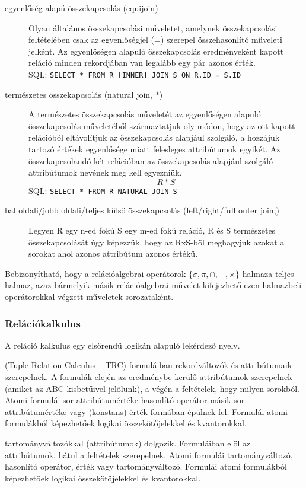 \begin{description}[nosep]
\begin{description}
		\item[egyenlőség alapú összekapcsolás (equijoin)] Olyan általános összekapcsolási műveletet, amelynek összekapcsolási feltételében csak az egyenlőségjel (=) szerepel összehasonlító műveleti jelként. Az egyenlőségen alapuló összekapcsolás eredményeként kapott reláció minden rekordjában van legalább egy pár azonos érték.\\
		SQL: \verb|SELECT * FROM R [INNER] JOIN S ON R.ID = S.ID|
		
		\item[természetes összekapcsolás (natural join, $*$)] A természetes összekapcsolás műveletét az egyenlőségen alapuló összekapcsolás műveletéből származtatjuk oly módon, hogy az ott kapott relációból eltávolítjuk az összekapcsolás alapjául szolgáló, a hozzájuk tartozó értékek egyenlősége miatt felesleges attribútumok egyikét. Az összekapcsolandó két relációban az összekapcsolás alapjául szolgáló attribútumok nevének meg kell egyezniük.
		$$R*S$$
		SQL: \verb|SELECT * FROM R NATURAL JOIN S|
		
		\item[bal oldali/jobb oldali/teljes külső összekapcsolás (left/right/full outer join,)] Legyen R egy n-ed fokú S egy m-ed fokú reláció, R és S természetes összekapcsolását úgy képezzük, hogy az RxS-ből meghagyjuk azokat a sorokat ahol azonos attribútum azonos értékű.
	\end{description}
\end{description}
\begin{theorem}
	Bebizonyítható, hogy a relációalgebrai operátorok $\{ \sigma, \pi, \cap, -, \times \}$ halmaza teljes halmaz, azaz bármelyik másik relációalgebrai művelet kifejezhető ezen halmazbeli operátorokkal végzett műveletek sorozataként.
\end{theorem}

\subsubsection{Relációkalkulus}
A reláció kalkulus egy elsőrendű logikán alapuló lekérdező nyelv. 
\begin{description}[nosep]
	\item[rekord alapú (soralapú) relációkalkulus] (Tuple Relation Calculus – TRC) formuláiban rekordváltozók és attribútumaik szerepelnek. A formulák elején az eredménybe kerülő attribútumok szerepelnek (amiket az ABC kisbetűivel jelölünk), a végén a feltételek, hogy milyen sorokból. Atomi formulái sor attribútumértéke hasonlító operátor másik sor attribútumértéke vagy (konstans) érték formában épülnek fel. Formulái atomi formulákból képezhetőek logikai összekötőjelekkel és kvantorokkal.
	\item[tartomány alapú relációkalkulus] tartományváltozókkal (attribútumok) dolgozik. Formuláiban elöl az attribútumok, hátul a feltételek szerepelnek. Atomi formulái tartományváltozó, hasonlító operátor, érték vagy tartományváltozó. Formulái atomi formulákból képezhetőek logikai összekötőjelekkel és kvantorokkal.
\end{description}

